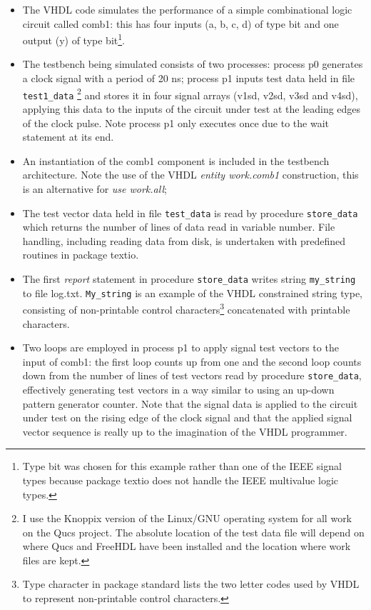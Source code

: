 \begin{itemize}
\item The VHDL code simulates the performance of a simple combinational logic circuit called comb1: this has four inputs (a, b, c, d) of type bit and one output (y) of type bit\footnote{Type bit was chosen for this example rather than one of the IEEE signal types because package textio does not handle the IEEE multivalue logic types.}.
\item The testbench being simulated consists of two processes: process p0 generates a clock signal with a period of 20 ns; process p1 inputs test data held in file \verb|test1_data| \footnote{I use the Knoppix version of the Linux/GNU operating system for all work on the Qucs project. The absolute location of the test data file will depend on where Qucs and FreeHDL have been installed and the location where work files are kept.} and stores it in four signal arrays (v1sd, v2sd, v3sd and v4sd), applying this data to the inputs of the circuit under test at the leading edges of the clock pulse. Note process p1 only executes once due to the wait statement at its end.  
\item An instantiation of the comb1 component is included in the testbench architecture.  Note the use of the VHDL \textit{entity work.comb1} construction, this is an alternative for \textit{use work.all};
\item The test vector data held in file \verb|test_data| is read by procedure \verb|store_data| which returns the number of lines of data read in variable number.  File handling, including reading data from disk, is undertaken with predefined routines in package textio.
\item The first \textit{report} statement in procedure \verb|store_data| writes string \verb|my_string| to file log.txt.  \verb|My_string| is an example of the VHDL constrained string type, consisting of non-printable control characters\footnote{Type character in package standard lists the two letter codes used by VHDL to represent non-printable control characters.} concatenated with printable characters.
\item Two loops are employed in process p1 to apply signal test vectors to the input of comb1: the first loop counts up from one and the second loop counts down from the number of lines of test vectors read by procedure \verb|store_data|, effectively generating test vectors in a way similar to using an up-down pattern generator counter. Note that the signal data is applied to the circuit under test on the rising edge of the clock signal and that the applied signal vector sequence is really up to the imagination of the VHDL programmer. 

\end{itemize}
